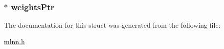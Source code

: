 \subsubsection[{weights\+Ptr}]{$\ast$ weights\+Ptr}\label{struct_network_aba0c89d93d01078126869da17a931b5b}


The documentation for this struct was generated from the following file\+:\begin{DoxyCompactItemize}
\item 
\hyperlink{mlnn_8h}{mlnn.\+h}\end{DoxyCompactItemize}
